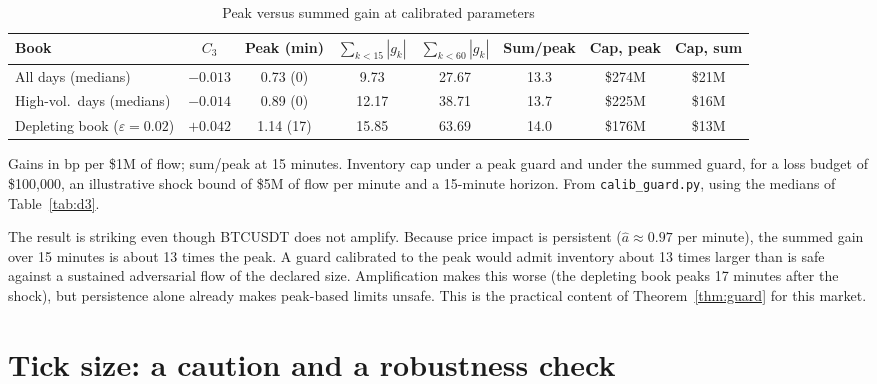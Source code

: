 \documentclass[12pt]{article}
\theoremstyle{definition}
\theoremstyle{remark}
\begin{document}
\begin{table}[t]\centering\small
\begin{threeparttable}
\caption{Peak versus summed gain at calibrated parameters}\label{tab:calib}
\setlength{\tabcolsep}{4pt}
\begin{tabular}{p{}ccccccc}
\toprule
Book & $C_3$ & Peak (min) & $\sum_{k<15}|g_k|$ & $\sum_{k<60}|g_k|$ & Sum/peak & Cap, peak & Cap, sum\\
\midrule
All days (medians) & $-0.013$ & 0.73 (0) & 9.73 & 27.67 & 13.3 & \$274M & \$21M\\
High-vol.\ days (medians) & $-0.014$ & 0.89 (0) & 12.17 & 38.71 & 13.7 & \$225M & \$16M\\
Depleting book ($\varepsilon=0.02$) & $+0.042$ & 1.14 (17) & 15.85 & 63.69 & 14.0 & \$176M & \$13M\\
\bottomrule
\end{tabular}
\begin{tablenotes}\footnotesize\item Gains in bp per \$1M of flow; sum/peak at 15 minutes. Inventory cap under a peak guard and under the summed guard, for a loss budget of \$100,000, an illustrative shock bound of \$5M of flow per minute and a 15-minute horizon. From \texttt{calib\_guard.py}, using the medians of Table~\ref{tab:d3}.\end{tablenotes}
\end{threeparttable}
\end{table}

The result is striking even though BTCUSDT does not amplify. Because price impact is persistent ($\hat a\approx0.97$ per minute), the summed gain over 15 minutes is about 13 times the peak. A guard calibrated to the peak would admit inventory about 13 times larger than is safe against a sustained adversarial flow of the declared size. Amplification makes this worse (the depleting book peaks 17 minutes after the shock), but persistence alone already makes peak-based limits unsafe. This is the practical content of Theorem~\ref{thm:guard} for this market.

\section{Tick size: a caution and a robustness check}
\end{document}
